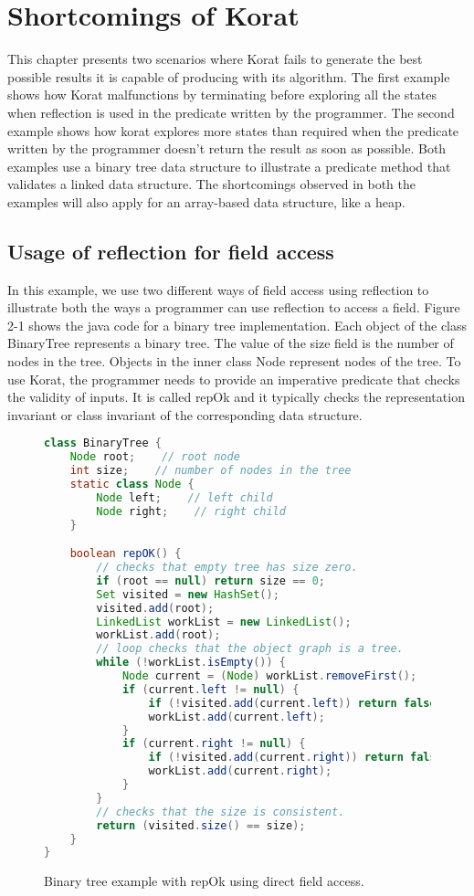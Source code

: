 \chapter{Shortcomings of Korat}
This chapter presents two scenarios where Korat fails to generate the best possible results it is capable of producing with its algorithm. The first example shows how Korat malfunctions by terminating before exploring all the states when reflection is used in the predicate written by the programmer. The second example shows how korat explores more states than required when the predicate written by the programmer doesn’t return the result as soon as possible. Both examples use a binary tree data structure to illustrate a predicate method that validates a linked data structure. The shortcomings observed in both the examples will also apply for an array-based data structure, like a heap.

\section{Usage of reflection for field access}
In this example, we use two different ways of field access using reflection to illustrate both the ways a programmer can use reflection to access a field. Figure 2-1 shows the java code  for a binary tree implementation. Each object of the class BinaryTree represents a binary tree. The value of the size field is the number of nodes in the tree. Objects in the inner class Node represent nodes of the tree. To use Korat, the programmer needs to provide an imperative predicate that checks the validity of inputs. It is called repOk and it typically checks the representation invariant or class invariant of the corresponding data structure. \\


\begin{figure}
\centering
\begin{lstlisting}[language=Java]
class BinaryTree {
    Node root;    // root node
    int size;    // number of nodes in the tree
    static class Node {
        Node left;    // left child
        Node right;    // right child
    }

    boolean repOK() {
        // checks that empty tree has size zero.
        if (root == null) return size == 0;
        Set visited = new HashSet();
        visited.add(root);
        LinkedList workList = new LinkedList();
        workList.add(root);
        // loop checks that the object graph is a tree.
        while (!workList.isEmpty()) {
            Node current = (Node) workList.removeFirst();
            if (current.left != null) {
                if (!visited.add(current.left)) return false;
                workList.add(current.left);
            }
            if (current.right != null) {
                if (!visited.add(current.right)) return false;
                workList.add(current.right);
            }
        }
        // checks that the size is consistent.
        return (visited.size() == size);
    }
}
\end{lstlisting}
\caption{Binary tree example with repOk using direct field access.}
\label{fig:btreeDirectRepOk}
\end{figure}

